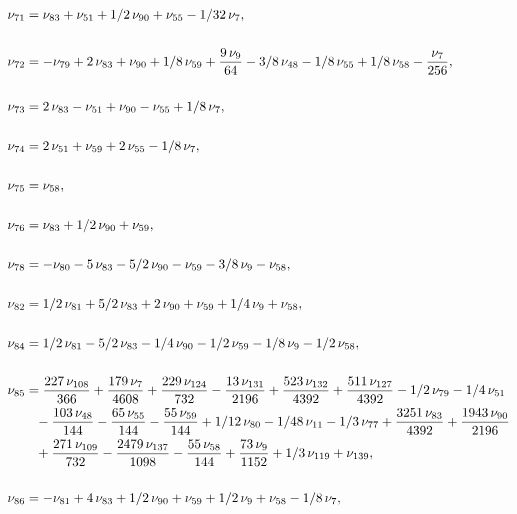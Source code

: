 \documentclass[a4paper,12pt, DIV=14, BCOR=5mm, twoside, headsepline]{scrbook}
\begin{document}
\begin{align}\label{AreaSol7}
\begin{aligned}
\nu_{{71}}&=\nu_{{83}}+\nu_{{51}}+1/2\,\nu_{{90}}
+\nu_{{55}}-1/32\,\nu_{{7}}, \\
\\
\nu_{{72}}&=-\nu_{{79}}+2\,\nu_{{83}}+\nu_{
{90}}+1/8\,\nu_{{59}}+{\frac {9\,\nu_{{9}}}{64}}-3/8\,\nu_{{48}}-1/8\,
\nu_{{55}}+1/8\,\nu_{{58}}-{\frac {\nu_{{7}}}{256}},\\
\\
\nu_{{73}}&=2\,\nu_
{{83}}-\nu_{{51}}+\nu_{{90}}-\nu_{{55}}+1/8\,\nu_{{7}}, \\
\\
\nu_{{74}}&=2\,
\nu_{{51}}+\nu_{{59}}+2\,\nu_{{55}}-1/8\,\nu_{{7}}, \\
\\
\nu_{{75}}&=\nu_{{58
}}, \\
\\
\nu_{{76}}&=\nu_{{83}}+1/2\,\nu_{{90}}+\nu_{{59}}, \\
\\
\nu_{{78}}&=-\nu_{{
80}}-5\,\nu_{{83}}-5/2\,\nu_{{90}}-\nu_{{59}}-3/8\,\nu_{{9}}-\nu_{{58}
}, \\
\\
\nu_{{82}}&=1/2\,\nu_{{81}}+5/2\,\nu_{{83}}+2\,\nu_{{90}}+\nu_{{59}}+
1/4\,\nu_{{9}}+\nu_{{58}}, \\
\\
\nu_{{84}}&=1/2\,\nu_{{81}}-5/2\,\nu_{{83}}-1
/4\,\nu_{{90}}-1/2\,\nu_{{59}}-1/8\,\nu_{{9}}-1/2\,\nu_{{58}}, \\
\\
\nu_{{85
}}&={\frac {227\,\nu_{{108}}}{366}}+{\frac {179\,\nu_{{7}}}{4608}}+{
\frac {229\,\nu_{{124}}}{732}}-{\frac {13\,\nu_{{131}}}{2196}}+{\frac 
{523\,\nu_{{132}}}{4392}}+{\frac {511\,\nu_{{127}}}{4392}}-1/2\,\nu_{{
79}}-1/4\,\nu_{{51}}\\
 &\hphantom{=}-{\frac {103\,\nu_{{48}}}{144}}-{\frac {65\,\nu_{{
55}}}{144}}-{\frac {55\,\nu_{{59}}}{144}}+1/12\,\nu_{{80}}-1/48\,\nu_{
{11}}-1/3\,\nu_{{77}}+{\frac {3251\,\nu_{{83}}}{4392}}+{\frac {1943\,
\nu_{{90}}}{2196}}\\
 &\hphantom{=}+{\frac {271\,\nu_{{109}}}{732}}-{\frac {2479\,\nu_{
{137}}}{1098}}-{\frac {55\,\nu_{{58}}}{144}}+{\frac {73\,\nu_{{9}}}{
1152}}+1/3\,\nu_{{119}}+\nu_{{139}}, \\
\\
\nu_{{86}}&=-\nu_{{81}}+4\,\nu_{{83
}}+1/2\,\nu_{{90}}+\nu_{{59}}+1/2\,\nu_{{9}}+\nu_{{58}}-1/8\,\nu_{{7}},\\

\end{aligned}
\end{align}
\end{document}

